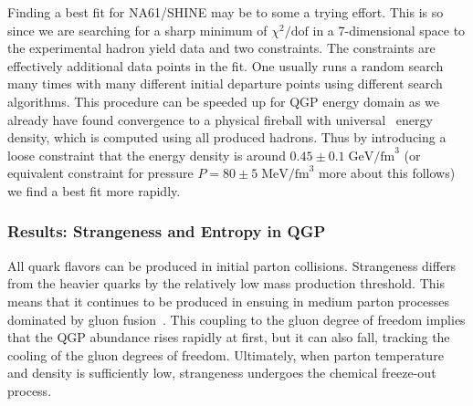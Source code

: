 \documentclass{appolb}
\begin{document}
Finding a best fit for NA61/SHINE may be to some a trying effort. This is so since we are searching for a sharp minimum of $\chi^2/\mathrm{dof}$ in a 7-dimensional space to the experimental hadron yield data and two constraints. The constraints are effectively additional data points in the fit. One usually runs a random search many times with many different initial departure points using different search algorithms. This procedure can be speeded up for QGP energy domain as we already have found  convergence to a physical fireball with universal \eg\ energy density, which is computed using all produced hadrons. Thus by introducing a loose constraint that the energy density is around $0.45\pm0.1\;\mathrm{GeV/fm}^3$ (or equivalent constraint for pressure $P=80\pm 5\;\mathrm{MeV/fm}^3$ more about this follows) we find a best fit more rapidly. 


\subsubsection{Results: Strangeness and Entropy in QGP}

All quark flavors can be produced in initial parton collisions. Strangeness differs from the heavier quarks by the relatively low mass production threshold. This means that it continues to be produced in ensuing in medium parton processes dominated by gluon fusion~\cite{Rafelski:1982pu}. This coupling to the gluon degree of freedom implies that the QGP abundance rises rapidly at first, but it can also fall, tracking the cooling of the gluon degrees of freedom. Ultimately, when parton temperature and density is sufficiently low, strangeness undergoes the chemical freeze-out process. 
\end{document}

